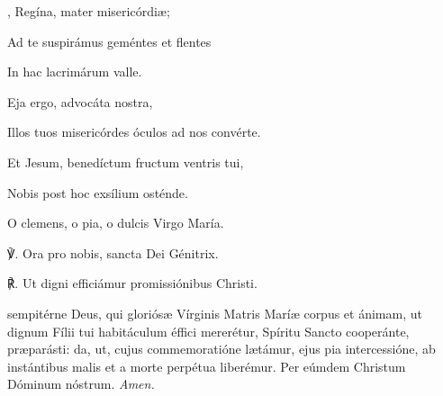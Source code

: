 {, Regína, mater misericórdi{\ae};\par
{}
Ad te suspirámus geméntes et flentes\par
In hac lacrimárum valle.\\
\par
Eja ergo, advocáta nostra,\par
Illos tuos misericórdes óculos ad nos convérte.\par
Et Jesum, benedíctum fructum ventris tui,\par
Nobis post hoc exsílium osténde.\par
O clemens, o pia, o dulcis Virgo María.\\
\par
℣. Ora pro nobis, sancta Dei Génitrix.\par
℟. Ut digni efficiámur promissiónibus Christi.\par
\oremuslatin
{} sempitérne Deus, qui gloriós{\ae} Vírginis Matris Marí{\ae} corpus et ánimam, ut dignum Fílii tui habitáculum éffici mererétur, Spíritu Sancto cooperánte, pr{\ae}parásti: da, ut, cujus commemoratióne l{\ae}támur, ejus pia intercessióne, ab instántibus malis et a morte perpétua liberémur. Per eúmdem Christum Dóminum nóstrum. \textit{Amen.}}